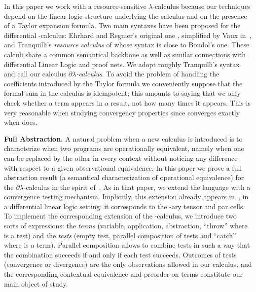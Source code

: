 \documentclass{LMCS}
\newcommand{\dlam}{\ensuremath{\partial\lambda}}
\newcommand{\lam}{\ensuremath{\lambda}}
\begin{document}
In this paper we work with a resource-sensitive \lam-calculus because our techniques depend on the linear logic structure underlying the calculus and on the presence
 of a Taylor expansion formula. Two main syntaxes have been proposed for the differential -calculus: Ehrhard and Regnier's original one \cite{EhrhardR03},
 simplified by Vaux in~\cite{Vaux07}, and Tranquilli's \emph{resource calculus} of \cite{Tranquilli10} whose syntax  is close to Boudol's one.
 These calculi share a common semantical backbone as well as similar connections with differential Linear Logic and proof nets. 
We adopt roughly Tranquilli's syntax and call our calculus  \emph{\dlam-calculus}. To avoid the problem of handling the coefficients introduced by the Taylor formula 
 we conveniently suppose that the formal sum in the calculus is idempotent; this amounts to saying that we only check whether a term appears in a result, not how many
 times it appears. This is very reasonable when studying convergency properties since  converges exactly when  does.


\medskip
{\bf Full Abstraction.} 
A natural problem when a new calculus is introduced is to characterize when two programs are operationally equivalent, 
namely when one can be replaced by the other in every context without noticing any difference with respect to a given observational equivalence. 
In this paper we prove a full abstraction result (a semantical characterization of operational equivalence)
for the \dlam-calculus in the spirit of~\cite{BoudolCL99}. As in that paper, we extend the 
language with a convergence testing mechanism. 
Implicitly, this extension already appears in~\cite{EhrhardL10}, in a differential linear logic setting: it corresponds to the
-ary tensor and par cells. To implement the corresponding extension of the 
-calculus, we
introduce two sorts of expressions: the \emph{terms} (variable, application,
abstraction, ``throw''  where   is a test) and the \emph{tests}
(empty test, parallel composition of tests and 
``catch''  where   is a term).
Parallel composition allows to combine tests in such a way that
the combination succeeds if and only if each test succeeds. 
Outcomes of tests (convergence or divergence) are the only observations
allowed in our calculus, and the corresponding contextual equivalence and preorder on terms
constitute our main object of study.
\end{document}
